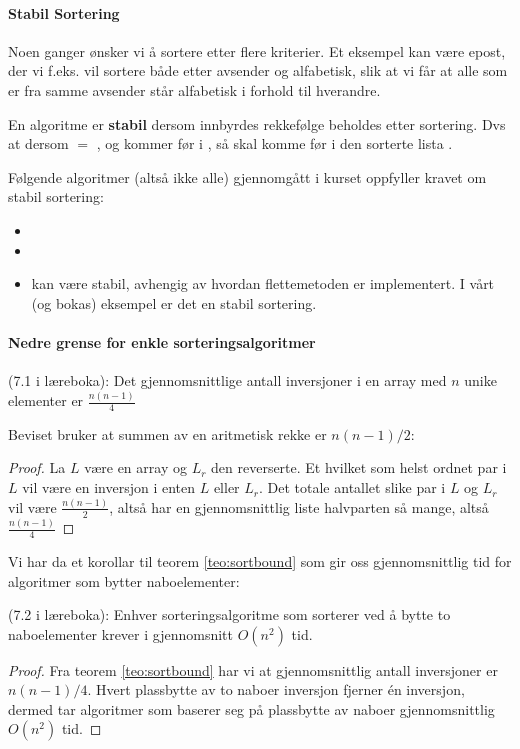 \paragraph{Stabil Sortering}\label{stabil}
Noen ganger ønsker vi å sortere etter flere kriterier. Et eksempel kan være
epost, der vi f.eks. vil sortere både etter avsender og alfabetisk, slik at vi
får at alle som er fra samme avsender står alfabetisk i forhold til hverandre.

\begin{definition}
  En algoritme er \textbf{stabil} dersom innbyrdes rekkefølge beholdes
  etter sortering. Dvs at dersom  $ = $ , og  kommer før  i , så skal  komme før  i den sorterte lista .
\end{definition}

Følgende algoritmer (altså ikke alle) gjennomgått i kurset oppfyller kravet om
stabil sortering:
\begin{itemize}
\item {} 
\item {} 
\item {} kan være stabil, avhengig av hvordan flettemetoden er implementert. I vårt (og bokas) eksempel er det en stabil sortering.
\end{itemize}


\paragraph{Nedre grense for enkle sorteringsalgoritmer}
\begin{theorem} (7.1 i læreboka): Det gjennomsnittlige antall inversjoner i en \label{teo:sortbound}
  array med $n$ unike elementer er $\frac{n(n-1)}{4}$
\end{theorem}
Beviset bruker at summen av en aritmetisk rekke er $ n(n-1)/2 $:
\begin{proof}
  La $L$ være en array og $L_r$ den reverserte. Et hvilket som helst ordnet par
  i $L$ vil være en inversjon i enten $L$ eller $L_r$. Det totale antallet slike
  par i $L$ og $L_r$ vil være $\frac{n(n-1)}{2}$, altså har en gjennomsnittlig
  liste halvparten så mange, altså $\frac{n(n-1)}{4}$ 
\end{proof}
Vi har da et korollar til teorem \ref{teo:sortbound} som gir oss gjennomsnittlig tid for algoritmer som bytter naboelementer:
\begin{theorem} (7.2 i læreboka): \label{teo:swapkompl}
  Enhver sorteringsalgoritme som sorterer ved å bytte to naboelementer krever i gjennomsnitt $ O(n^2) $ tid.
\end{theorem}
\begin{proof}
Fra teorem \ref{teo:sortbound} har vi at gjennomsnittlig antall inversjoner er $ n(n-1)/4 $. Hvert plassbytte av to naboer inversjon fjerner én inversjon, dermed tar algoritmer som baserer seg på plassbytte av naboer gjennomsnittlig $ O(n^2) $ tid.
\end{proof}




